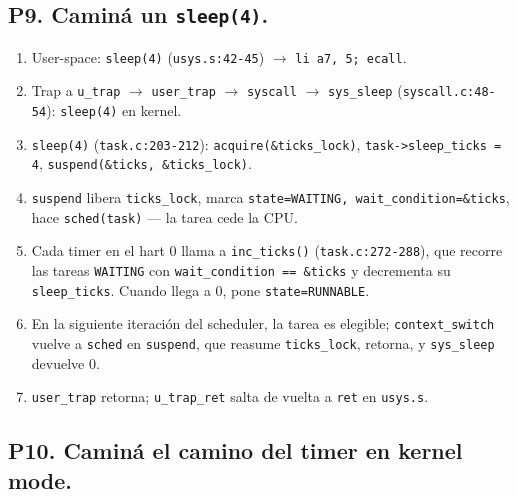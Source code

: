 \documentclass[11pt,a4paper]{article}
\begin{document}
\subsection*{P9. Caminá un \texttt{sleep(4)}.}

\begin{respuesta}
\begin{enumerate}[leftmargin=*,nosep]
    \item User-space: \texttt{sleep(4)} (\texttt{usys.s:42-45})
        $\to$ \texttt{li a7, 5; ecall}.
    \item Trap a \texttt{u\_trap} $\to$ \texttt{user\_trap} $\to$
        \texttt{syscall} $\to$ \texttt{sys\_sleep}
        (\texttt{syscall.c:48-54}): \texttt{sleep(4)} en kernel.
    \item \texttt{sleep(4)} (\texttt{task.c:203-212}):
        \texttt{acquire(\&ticks\_lock)}, \texttt{task->sleep\_ticks
        = 4}, \texttt{suspend(\&ticks, \&ticks\_lock)}.
    \item \texttt{suspend} libera \texttt{ticks\_lock}, marca
        \texttt{state=WAITING, wait\_condition=\&ticks}, hace
        \texttt{sched(task)} — la tarea cede la CPU.
    \item Cada timer en el hart 0 llama a \texttt{inc\_ticks()}
        (\texttt{task.c:272-288}), que recorre las tareas
        \texttt{WAITING} con \texttt{wait\_condition == \&ticks} y
        decrementa su \texttt{sleep\_ticks}. Cuando llega a 0, pone
        \texttt{state=RUNNABLE}.
    \item En la siguiente iteración del scheduler, la tarea es
        elegible; \texttt{context\_switch} vuelve a \texttt{sched}
        en \texttt{suspend}, que reasume \texttt{ticks\_lock},
        retorna, y \texttt{sys\_sleep} devuelve 0.
    \item \texttt{user\_trap} retorna; \texttt{u\_trap\_ret} salta
        de vuelta a \texttt{ret} en \texttt{usys.s}.
\end{enumerate}
\end{respuesta}

\subsection*{P10. Caminá el camino del timer en kernel mode.}
\end{document}
